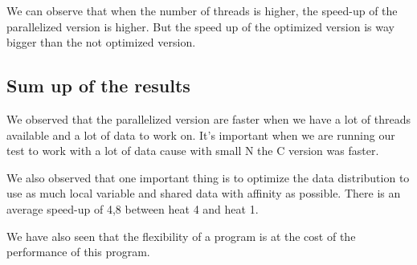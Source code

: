 \documentclass{report}
\begin{document}
We can observe that when the number of threads is higher, the speed-up of the parallelized version is higher. But the speed up of the optimized version is way bigger than the not optimized version.

\subsection{Sum up of the results}

We observed that the parallelized version are faster when we have a lot of threads available and a lot of data to work on. It's important when we are running our test to work with a lot of data cause with small N the C version was faster. 

We also observed that one important thing is to optimize the data distribution to use as much local variable and shared data with affinity as possible. There is an average speed-up of 4,8 between heat 4 and heat 1.

We have also seen that the flexibility of a program is at the cost of the performance of this program.

\listoffigures
\end{document}
